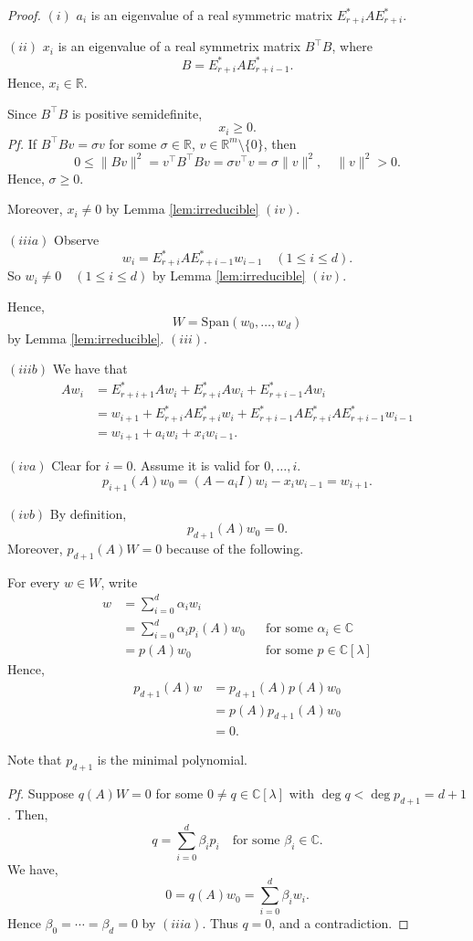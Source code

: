 \documentclass[
]{book}
\theoremstyle{definition}
\theoremstyle{definition}
\theoremstyle{definition}
\theoremstyle{definition}
\theoremstyle{remark}
\begin{document}
\begin{proof}
\((i)\) \(a_i\) is an eigenvalue of a real symmetric matrix \(E_{r+i}^*AE^*_{r+i}\).

\((ii)\) \(x_i\) is an eigenvalue of a real symmetrix matrix \(B^\top B\), where
\[B = E^*_{r+i}AE^*_{r+i-1}.\]
Hence, \(x_i\in \mathbb{R}\).

Since \(B^\top B\) is positive semidefinite,
\[x_i \geq 0.\]
\emph{Pf.} If \(B^\top Bv = \sigma v\) for some \(\sigma \in \mathbb{R}\), \(v\in \mathbb{R}^m \setminus \{0\}\), then
\[0\leq \|Bv\|^2 = v^\top B^\top Bv = \sigma v^\top v = \sigma \|v\|^2, \quad \|v\|^2 >0.\]
Hence, \(\sigma \geq 0\).

Moreover, \(x_i\neq 0\) by Lemma \ref{lem:irreducible} \((iv)\).

\((iiia)\) Observe
\[w_i = E^*_{r+i}AE^*_{r+i-1}w_{i-1} \quad (1\leq i \leq d).\]
So \(w_i \neq 0 \quad (1\leq i \leq d)\) by Lemma \ref{lem:irreducible} \((iv)\).

Hence,
\[W = \mathrm{Span}(w_0, \ldots, w_d)\]
by Lemma \ref{lem:irreducible}. \((iii)\).

\((iiib)\) We have that
\begin{align}
Aw_i & = E^*_{r+i+1}Aw_i + E_{r+i}^*Aw_i + E^*_{r+i-1}Aw_i\\
& = w_{i+1} + E^*_{r+i}AE^*_{r+i}w_i + E^*_{r+i-1}AE^*_{r+i}AE^*_{r+i-1}w_{i-1}\\
& = w_{i+1} + a_iw_{i} + x_iw_{i-1}.
\end{align}

\((iva)\) Clear for \(i=0\). Assume it is valid for \(0, \ldots, i\).
\[p_{i+1}(A)w_0 = (A-a_iI)w_i - x_iw_{i-1} = w_{i+1}.\]

\((ivb)\) By definition,
\[p_{d+1}(A)w_0 = 0.\]
Moreover, \(p_{d+1}(A)W = 0\) because of the following.

For every \(w\in W\), write
\begin{align}
w & = \sum_{i=0}^d \alpha_i w_i \\
& = \sum_{i=0}^d \alpha_i p_i(A)w_0 && \text{for some }\alpha_i\in\mathbb{C}\\
& = p(A)w_0 && \text{for some }p\in \mathbb{C}[\lambda]
\end{align}
Hence,
\begin{align}
p_{d+1}(A)w & = p_{d+1}(A)p(A)w_0\\
& = p(A)p_{d+1}(A)w_0\\
& = 0.
\end{align}

Note that \(p_{d+1}\) is the minimal polynomial.

\emph{Pf.}
Suppose \(q(A)W = 0\) for some \(0\neq q\in \mathbb{C}[\lambda]\) with \(\deg q < \deg p_{d+1} = d+1\).
Then,
\[q = \sum_{i=0}^d\beta_ip_i \quad \text{for some }\beta_i\in \mathbb{C}.\]
We have,
\[0  = q(A)w_0  = \sum_{i=0}^d \beta_iw_i.\]
Hence \(\beta_0 = \cdots = \beta_d = 0\) by \((iiia)\). Thus \(q = 0\), and a contradiction.
\end{proof}
\end{document}
